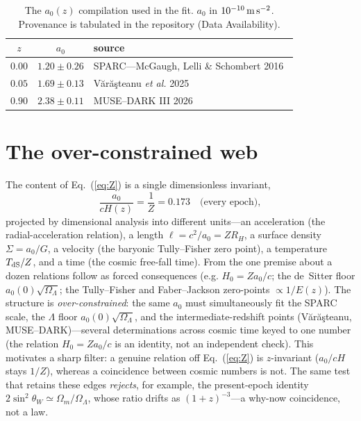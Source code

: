 \documentclass[aps,prd,preprint,nofootinbib,floatfix]{revtex4-2}
\begin{document}
\begin{table}[t]
\caption{The $a_0(z)$ compilation used in the fit. $a_0$ in
$10^{-10}\,{\rm m\,s^{-2}}$. Provenance is tabulated in the repository
(Data Availability).}
\label{tab:data}
\begin{ruledtabular}
\begin{tabular}{ccl}
$z$ & $a_0$ & source\\
\hline
$0.00$ & $1.20\pm0.26$ & SPARC---McGaugh, Lelli \& Schombert 2016~\cite{McGaugh2016}\\
$0.05$ & $1.69\pm0.13$ & V\u{a}r\u{a}\c{s}teanu \textit{et al.} 2025~\cite{Varasteanu2025}\\
$0.90$ & $2.38\pm0.11$ & MUSE--DARK III 2026~\cite{MUSEDARK2026}\\
\end{tabular}
\end{ruledtabular}
\end{table}

\section{The over-constrained web}
The content of Eq.~(\ref{eq:Z}) is a single dimensionless invariant,
\begin{equation}
\frac{a_0}{cH(z)}=\frac{1}{Z}=0.173 \quad\text{(every epoch)},
\end{equation}
projected by dimensional analysis into different units---an acceleration (the
radial-acceleration relation), a length $\ell=c^2/a_0=Z R_H$, a surface density
$\Sigma=a_0/G$, a velocity (the baryonic Tully--Fisher zero point), a temperature
$T_{\rm dS}/Z$, and a time (the cosmic free-fall time). From the one premise about
a dozen relations follow as forced consequences (e.g. $H_0=Za_0/c$; the de~Sitter
floor $a_0(0)\sqrt{\Omega_\Lambda}$; the Tully--Fisher and Faber--Jackson
zero-points $\propto1/E(z)$). The structure is {\it over-constrained}: the same
$a_0$ must simultaneously fit the SPARC scale, the $\Lambda$ floor
$a_0(0)\sqrt{\Omega_\Lambda}$, and the intermediate-redshift points
(V\u{a}r\u{a}\c{s}teanu, MUSE--DARK)---several determinations across cosmic time keyed
to one number (the relation $H_0=Za_0/c$ is an identity, not an independent check). This motivates a sharp filter: a
genuine relation off Eq.~(\ref{eq:Z}) is $z$-invariant ($a_0/cH$ stays $1/Z$),
whereas a coincidence between cosmic numbers is not. The same test that retains
these edges {\it rejects}, for example, the present-epoch identity
$2\sin^2\theta_W\simeq\Omega_m/\Omega_\Lambda$, whose ratio drifts as
$(1+z)^{-3}$---a why-now coincidence, not a law.
\end{document}
